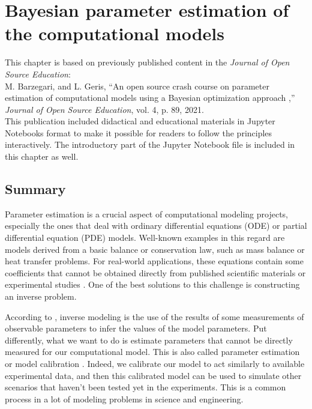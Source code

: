 \chapter{Bayesian parameter estimation of the computational models}\label{ch:bayesian}

\begin{shaded}
This chapter is based on previously published content in the \textit{Journal of Open Source Education}:\\
M. Barzegari, and L. Geris, ``An open source crash course on parameter estimation of computational models using a Bayesian optimization approach
,'' \textit{Journal of Open Source Education}, vol. 4, p. 89, 2021.\\
This publication included didactical and educational materials in Jupyter Notebooks format to make it possible for readers to follow the principles interactively. The introductory part of the Jupyter Notebook file is included in this chapter as well.
\end{shaded}

\section{Summary}

Parameter estimation is a crucial aspect of computational modeling projects, especially the ones that deal with ordinary differential equations (\gls{ODE}) or partial differential equation (\gls{PDE}) models. Well-known examples in this regard are models derived from a basic balance or conservation law, such as mass balance or heat transfer problems. For real-world applications, these equations contain some coefficients that cannot be obtained directly from published scientific materials or experimental studies \cite{Dehghan2001}. One of the best solutions to this challenge is constructing an inverse problem.

According to \cite{Tarantola1987}, inverse modeling is the use of the results of some measurements of observable parameters to infer the values of the model parameters. Put differently, what we want to do is estimate parameters that cannot be directly measured for our computational model. This is also called parameter estimation or model calibration \cite{Carson2014}. Indeed, we calibrate our model to act similarly to available experimental data, and then this calibrated model can be used to simulate other scenarios that haven't been tested yet in the experiments. This is a common process in a lot of modeling problems in science and engineering.

